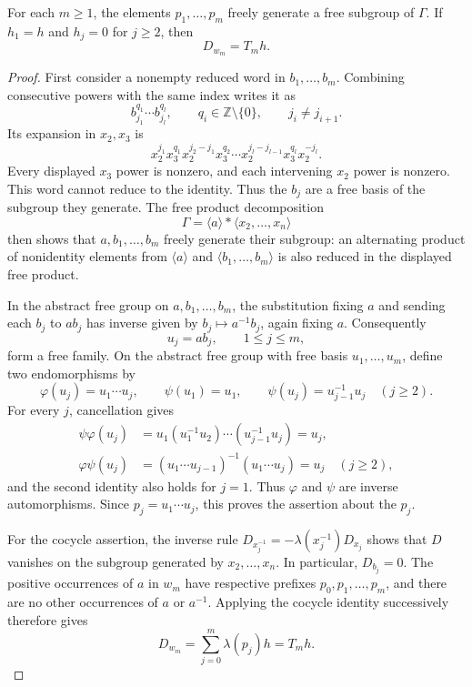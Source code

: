 \begin{lemma}
\label{lem:cocycle-prefixes}
For each $m\geq 1$, the elements $p_1,\ldots,p_m$ freely generate a
free subgroup of $\Gamma$.  If $h_1=h$ and $h_j=0$ for $j\geq 2$,
then
\begin{equation}
\label{eq:cocycle-word-value}
  D_{w_m}=T_m h.
\end{equation}
\end{lemma}

\begin{proof}
First consider a nonempty reduced word in $b_1,\ldots,b_m$.
Combining consecutive powers with the same index writes it as
\[
  b_{j_1}^{q_1}\cdots b_{j_l}^{q_l},
  \qquad q_i\in\mathbb Z\setminus\{0\},
  \qquad j_i\ne j_{i+1}.
\]
Its expansion in $x_2,x_3$ is
\[
  x_2^{j_1}x_3^{q_1}
  x_2^{j_2-j_1}x_3^{q_2}\cdots
  x_2^{j_l-j_{l-1}}x_3^{q_l}x_2^{-j_l}.
\]
Every displayed $x_3$ power is nonzero, and each intervening $x_2$
power is nonzero.  This word cannot reduce to the identity.
Thus the $b_j$ are a free basis of the subgroup they generate.
The free product decomposition
\[
  \Gamma=\langle a\rangle *\langle x_2,\ldots,x_n\rangle
\]
then shows that $a,b_1,\ldots,b_m$ freely generate their subgroup:
an alternating product of nonidentity elements from
$\langle a\rangle$ and $\langle b_1,\ldots,b_m\rangle$ is also
reduced in the displayed free product.

In the abstract free group on $a,b_1,\ldots,b_m$, the substitution
fixing $a$ and sending each $b_j$ to $a b_j$ has inverse given by
$b_j\mapsto a^{-1}b_j$, again fixing $a$.
Consequently
\[
  u_j=a b_j,\qquad 1\leq j\leq m,
\]
form a free family.  On the abstract free group with free basis
$u_1,\ldots,u_m$, define two endomorphisms by
\[
  \varphi(u_j)=u_1\cdots u_j,
  \qquad
  \psi(u_1)=u_1,
  \qquad
  \psi(u_j)=u_{j-1}^{-1}u_j\quad (j\geq 2).
\]
For every $j$, cancellation gives
\begin{align*}
  \psi\varphi(u_j)
    &=u_1(u_1^{-1}u_2)\cdots(u_{j-1}^{-1}u_j)=u_j,\\
  \varphi\psi(u_j)
    &=(u_1\cdots u_{j-1})^{-1}(u_1\cdots u_j)=u_j
       \quad (j\geq 2),
\end{align*}
and the second identity also holds for $j=1$.
Thus $\varphi$ and $\psi$ are inverse automorphisms.
Since $p_j=u_1\cdots u_j$, this proves the assertion about the
$p_j$.

For the cocycle assertion, the inverse rule
$D_{x_j^{-1}}=-\lambda(x_j^{-1})D_{x_j}$ shows that $D$ vanishes
on the subgroup generated by $x_2,\ldots,x_n$.
In particular, $D_{b_j}=0$.
The positive occurrences of $a$ in $w_m$ have respective prefixes
$p_0,p_1,\ldots,p_m$, and there are no other occurrences of $a$
or $a^{-1}$.
Applying the cocycle identity successively therefore gives
\[
  D_{w_m}=\sum_{j=0}^m\lambda(p_j)h=T_mh.
\]
\end{proof}

